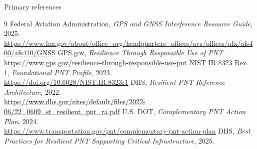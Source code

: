 \documentclass[aspectratio=169,11pt]{beamer}
\begin{document}
\begin{frame}{Primary references}
  \small
  \begin{thebibliography}{9}
      Federal Aviation Administration,
      \emph{GPS and GNSS Interference Resource Guide}, 2025.\\
      \url{https://www.faa.gov/about/office_org/headquarters_offices/avs/offices/afx/afs400/afs410/GNSS}
      GPS.gov, \emph{Resilience Through Responsible Use of PNT}.\\
      \url{https://www.gps.gov/resilience-through-responsible-use-pnt}
      NIST IR 8323 Rev. 1, \emph{Foundational PNT Profile}, 2023.\\
      \url{https://doi.org/10.6028/NIST.IR.8323r1}
      DHS, \emph{Resilient PNT Reference Architecture}, 2022.\\
      \url{https://www.dhs.gov/sites/default/files/2022-06/22_0609_st_resilient_pnt_ra.pdf}
      U.S. DOT, \emph{Complementary PNT Action Plan}, 2024.\\
      \url{https://www.transportation.gov/pnt/complementary-pnt-action-plan}
      DHS, \emph{Best Practices for Resilient PNT Supporting Critical Infrastructure}, 2025.
  \end{thebibliography}
\end{frame}
\end{document}

